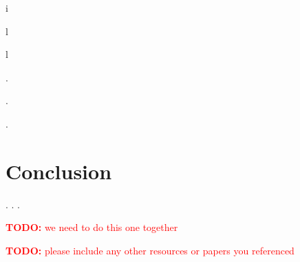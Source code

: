 \documentclass[11pt, oneside]{article}
\newcommand{\TODO}[1]{\textcolor{red}{\textbf{TODO: } #1}}
\begin{document}
i

l

l

.

.

.


\section{Conclusion}

.
.
.


\TODO{we need to do this one together}




%
%
%

\TODO{please include any other resources or papers you referenced}
\end{document}
